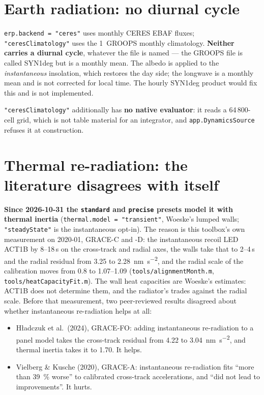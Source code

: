 \documentclass[11pt,a4paper]{report}
\begin{document}
\section{Earth radiation: no diurnal cycle}
\texttt{erp.backend = "ceres"} uses monthly CERES EBAF fluxes; \texttt{"ceresClimatology"} uses the
1\textdegree\ GROOPS monthly climatology. \textbf{Neither carries a diurnal cycle}, whatever the
file is named --- the GROOPS file is called SYN1deg but is a monthly mean. The albedo is applied to
the \emph{instantaneous} insolation, which restores the day side; the longwave is a monthly mean and
is not corrected for local time. The hourly SYN1deg product would fix this and is not implemented.

\texttt{"ceresClimatology"} additionally has \textbf{no native evaluator}: it reads a 64\,800-cell
grid, which is not table material for an integrator, and \texttt{app.DynamicsSource} refuses it at
construction.

\section{Thermal re-radiation: the literature disagrees with itself}
\label{sec:trp}
\textbf{Since 2026-10-31 the \texttt{standard} and \texttt{precise} presets model it with thermal inertia}
(\texttt{thermal.model = "transient"}, Woeske's lumped walls; \texttt{"steadyState"} is the
instantaneous opt-in). The reason is this toolbox's own measurement on 2020-01,
GRACE-C and -D: the instantaneous recoil LED ACT1B by 8--18\,s on the cross-track and radial axes,
the walls take that to 2--4\,s and the radial residual from 3.25 to \SI{2.28}{\nano\metre\per\second\squared},
and the radial scale of the calibration moves from 0.8 to 1.07--1.09 (\texttt{tools/alignmentMonth.m},
\texttt{tools/heatCapacityFit.m}). The wall heat capacities are Woeske's estimates: ACT1B does not
determine them, and the radiator's trades against the radial scale. Before that measurement, two
peer-reviewed results disagreed about whether instantaneous re-radiation helps at all:

\begin{itemize}[leftmargin=1.4em]
\item Hładczuk et al.\ (2024), GRACE-FO: adding instantaneous re-radiation to a panel model takes
 the cross-track residual from \SI{4.22}{} to \SI{3.04}{\nano\metre\per\second\squared}, and thermal
 inertia takes it to \SI{1.70}{}. It helps.
\item Vielberg \& Kusche (2020), GRACE-A: instantaneous re-radiation fits ``more than \SI{39}{\percent}
 worse'' to calibrated cross-track accelerations, and ``did not lead to improvements''. It hurts.
\end{itemize}
\end{document}
